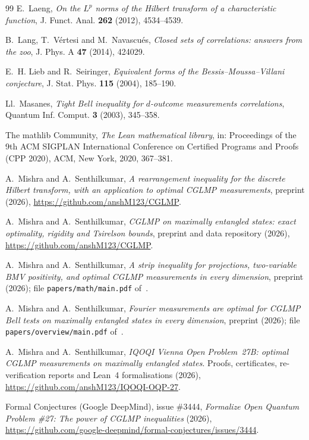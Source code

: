 \documentclass[11pt]{article}
\theoremstyle{remark}
\numberwithin{equation}{section}
\begin{document}
\begin{thebibliography}{99}
E.~Laeng, \emph{On the $L^p$ norms of the Hilbert transform of a characteristic function}, J. Funct. Anal. \textbf{262}
(2012), 4534--4539.

B.~Lang, T.~V\'ertesi and M.~Navascu\'es, \emph{Closed sets of correlations: answers from the zoo}, J. Phys. A
\textbf{47} (2014), 424029.

E.~H. Lieb and R.~Seiringer, \emph{Equivalent forms of the Bessis--Moussa--Villani conjecture}, J. Stat. Phys.
\textbf{115} (2004), 185--190.

Ll.~Masanes, \emph{Tight Bell inequality for $d$-outcome measurements correlations}, Quantum Inf. Comput. \textbf{3}
(2003), 345--358.

The mathlib Community, \emph{The Lean mathematical library}, in: Proceedings of the 9th ACM SIGPLAN International
Conference on Certified Programs and Proofs (CPP 2020), ACM, New York, 2020, 367--381.

A.~Mishra and A.~Senthilkumar, \emph{A rearrangement inequality for the discrete Hilbert transform, with an application
to optimal CGLMP measurements}, preprint (2026), \url{https://github.com/anshM123/CGLMP}.

A.~Mishra and A.~Senthilkumar, \emph{CGLMP on maximally entangled states: exact optimality, rigidity and Tsirelson
bounds}, preprint and data repository (2026), \url{https://github.com/anshM123/CGLMP}.

A.~Mishra and A.~Senthilkumar, \emph{A strip inequality for projections, two-variable BMV positivity, and optimal CGLMP
measurements in every dimension}, preprint (2026); file \texttt{papers/math/main.pdf} of~\cite{repo}.

A.~Mishra and A.~Senthilkumar, \emph{Fourier measurements are optimal for CGLMP Bell tests on maximally entangled
states in every dimension}, preprint (2026); file \texttt{papers/overview/main.pdf} of~\cite{repo}.

A.~Mishra and A.~Senthilkumar, \emph{IQOQI Vienna Open Problem~27B: optimal CGLMP measurements on maximally entangled
states}. Proofs, certificates, re-verification reports and Lean~4 formalisations (2026),
\url{https://github.com/anshM123/IQOQI-OQP-27}.

Formal Conjectures (Google DeepMind), issue \#3444, \emph{Formalize Open Quantum Problem \#27: The power of CGLMP
inequalities} (2026), \url{https://github.com/google-deepmind/formal-conjectures/issues/3444}.


\end{thebibliography}
\end{document}
